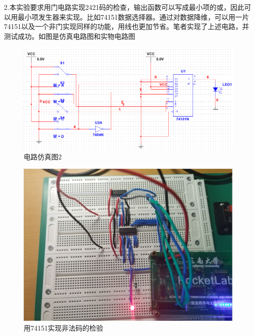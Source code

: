 \documentclass{ctexart}
\begin{document}
2.本实验要求用门电路实现2421码的检查，输出函数可以写成最小项的或，因此可以用最小项发生器来实现。比如74151数据选择器。通过对数据降维，可以用一片74151以及一个非门实现同样的功能，用线也更加节省。笔者实现了上述电路，并测试成功。如图是仿真电路图和实物电路图
\begin{figure}[H]
    \centering
    \includegraphics[width=0.6\linewidth]{fig/电路仿真图2.png}
    \caption{电路仿真图2}
    \label{电路仿真图2}
\end{figure}
\begin{figure}[H]
    \centering
    \includegraphics[width=0.6\linewidth]{fig/实物电路图2.png}
    \caption{用74151实现非法码的检验}
    \label{实物电路图2}
\end{figure}
\end{document}
